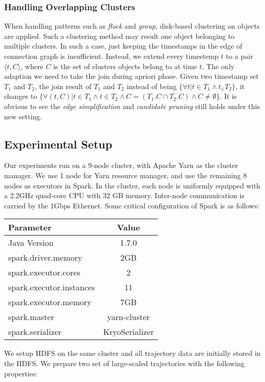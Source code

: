 \subsubsection{Handling Overlapping Clusters}
When handling patterns such as \emph{flock} and \emph{group}, disk-based clustering
on objects are applied. Such a clustering method may result one object belonging to
multiple clusters. In such a case, just keeping the timestamps in the edge
of connection graph is insufficient. Instead, we extend every timestemp $t$
to a pair $\langle t,C \rangle$, where $C$ is the set of clusters objects
belong to at time $t$. The only adaption we need to take the join during
apriori phase. Given two timestamp set $T_1$ and $T_2$, the join result of
$T_1$ and $T_2$ instead of being $\{\forall t | t\in T_1 \wedge t_\in T_2\}$,
it changes to $\{\forall (t,C) | t\in T_1 \wedge t \in T_2 \wedge C = (T_1.C \cap T_2.C) \wedge C \neq \emptyset\}$.
It is obvious to see the \emph{edge simplification} and \emph{candidate pruning} 
still holds under this new setting.


\subsection{Experimental Setup}
Our experiments run on a 9-node cluster, with Apache Yarn as
the cluster manager. We use 1 node for Yarn resource manager, 
and use the remaining 8 nodes as executors in Spark. In the 
cluster, each node is uniformly equipped with a 2.2GHz quad-core CPU
with 32 GB memory. Inter-node communication is carried by 
the 1Gbps Ethernet.  Some critical configuration of Spark is 
as follows:
\begin{table} [h]
\centering
\begin{tabular}{|l|c|}
\hline 
Parameter & Value  \\ 
\hline 
Java Version & 1.7.0 \\ 
\hline 
spark.driver.memory & 2GB \\ 
\hline 
spark.executor.cores & 2  \\ 
\hline 
spark.executor.instances & 11 \\ 
\hline 
spark.executor.memory & 7GB \\ 
\hline 
spark.master & yarn-cluster \\ 
\hline 
spark.serializer & KryoSerializer \\ 
\hline 
\end{tabular} 
\end{table}

We setup HDFS on the same cluster and all trajectory data
are initially stored in the HDFS. We prepare two set of
large-scaled trajectories with the following properties:





